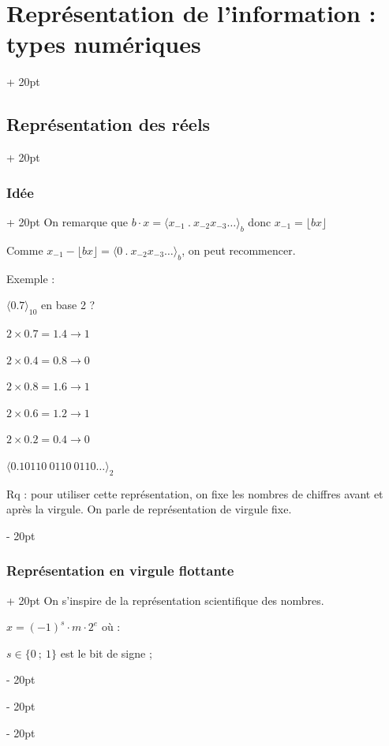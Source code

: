 \documentclass[a4paper, 12pt, twoside]{article}
\newcommand{\ind}[1][20pt]{\advance\leftskip + #1}
\newcommand{\deind}[1][20pt]{\advance\leftskip - #1}
\newenvironment{indentedenv}[1][20pt]{\par \ind[#1]}{\par \deind}
\newenvironment{indt}[2][20pt]{#2 \begin{indentedenv}[#1]}{\end{indentedenv}} %
\begin{document}
\begin{indt}{\section{Représentation de l'information : types numériques}}
\begin{indt}{\subsection{Représentation des réels}}
\begin{indt}{\subsubsection{Idée}}
                On remarque que $b \cdot x = \langle x_{-1}\ .\ x_{-2} x_{-3} \ldots \rangle_b$ donc $x_{-1} = \lfloor bx \rfloor$
                
                Comme $x_{-1} - \lfloor bx \rfloor = \langle 0\ .\ x_{-2} x_{-3} \ldots \rangle_b$, on peut recommencer.
                
                \vspace{6pt}
                
                Exemple :
                
                $\langle 0.7 \rangle_{10}$ en base 2 ?
                
                $2 \times 0.7 = 1.4 \rightarrow 1$
                
                $2 \times 0.4 = 0.8 \rightarrow 0$
                
                $2 \times 0.8 = 1.6 \rightarrow 1$
                
                $2 \times 0.6 = 1.2 \rightarrow 1$
                
                $2 \times 0.2 = 0.4 \rightarrow 0$
                
                $\langle 0.10110\ 0110\ 0110 \ldots \rangle_2$
                
                \vspace{12pt}
                
                Rq : pour utiliser cette représentation, on fixe les nombres de chiffres avant et après la virgule. On parle de représentation de virgule fixe.
            \end{indt}
            
            \vspace{12pt}
            
            \begin{indt}{\subsubsection{Représentation en virgule flottante}}
                On s'inspire de la représentation scientifique des nombres.
                
                \vspace{6pt}
                
                $x = (-1)^s \cdot m \cdot 2^e$ où :
                
                $s \in \{0\ ;\ 1\}$ est le bit de signe ;
                

\end{indt}
\end{indt}
\end{indt}
\end{document}
